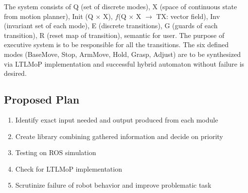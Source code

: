 \documentclass[10pt]{article}
\begin{document}
The system consists of Q (set of discrete modes), X (space of continuous state from motion planner), Init (Q $\times$ X), $f$(Q $\times$ X $\to$ TX: vector field), Inv (invariant set of each mode), E (discrete transitions), G (guards of each transition), R (reset map of transition), semantic for user. The purpose of executive system is to  be responsible for all the transitions. The six defined modes (BaseMove, Stop, ArmMove, Hold, Grasp, Adjust) are to be synthesized via LTLMoP implementation and successful hybrid automaton without failure is desired.
 
 \subsection*{Proposed Plan}
 \begin{enumerate}
 \item Identify exact input needed and output produced from each module
 \item Create library combining gathered information and decide on priority
 \item Testing on ROS simulation 
 \item Check for LTLMoP implementation
 \item Scrutinize failure of robot behavior and improve problematic task
\end{enumerate} 
\nocite{*} 



 
\end{document}
